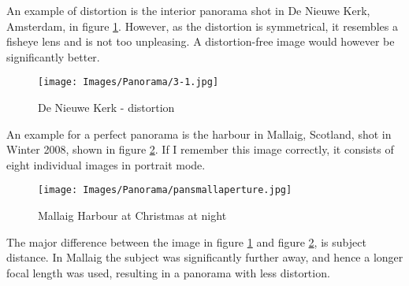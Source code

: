 An example of distortion is the interior \gls{panorama} shot in De Nieuwe Kerk, Amsterdam, in figure \ref{fig:3-1}. However, as the distortion is symmetrical, it resembles a fisheye lens and is not too unpleasing. A distortion-free image would however be significantly better.

\begin{figure}[htb]
	\centering
		\texttt{[image: Images/Panorama/3-1.jpg]}
	\caption{De Nieuwe Kerk - distortion}
	\label{fig:3-1}
\end{figure}

An example for a perfect \gls{panorama} is the harbour in Mallaig, Scotland, shot in Winter 2008, shown in figure \ref{fig:pansmallaperture}. If I remember this image correctly, it consists of eight individual images in portrait mode.

\begin{figure}[htb]
	\centering
		\texttt{[image: Images/Panorama/pansmallaperture.jpg]}
	\caption{Mallaig Harbour at Christmas at night}
	\label{fig:pansmallaperture}
\end{figure}

The major difference between the image in figure \ref{fig:3-1} and figure \ref{fig:pansmallaperture}, is subject distance. In Mallaig the subject was significantly further away, and hence a longer focal length was used, resulting in a \gls{panorama} with less distortion.
